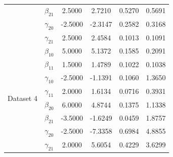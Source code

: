 \begin{table}[!h]
{\begin{tabular}{lccccc}
 & $\beta_{21}$ & 2.5000 & 2.7210 & 0.5270 & 0.5691\\
 & $\gamma_{20}$ & -2.5000 & -2.3147 & 0.2582 & 0.3168\\
 & $\gamma_{21}$ & 2.5000 & 2.4584 & 0.1013 & 0.1091\\
\midrule
\multirow{8}{*}{Dataset 4} & $\beta_{10}$ & 5.0000 & 5.1372 & 0.1585 & 0.2091\\
 & $\beta_{11}$ & 1.5000 & 1.4789 & 0.1022 & 0.1038\\
 & $\gamma_{10}$ & -2.5000 & -1.1391 & 0.1060 & 1.3650\\
 & $\gamma_{11}$ & 2.0000 & 1.6134 & 0.0716 & 0.3931\\
 & $\beta_{20}$ & 6.0000 & 4.8744 & 0.1375 & 1.1338\\
 & $\beta_{21}$ & -3.5000 & -1.6249 & 0.0459 & 1.8757\\
 & $\gamma_{20}$ & -2.5000 & -7.3358 & 0.6984 & 4.8855\\
 & $\gamma_{21}$ & 2.0000 & 5.6054 & 0.4229 & 3.6299\\
\bottomrule
\end{tabular}
}
    \label{tab:sim_more}
\end{table}
